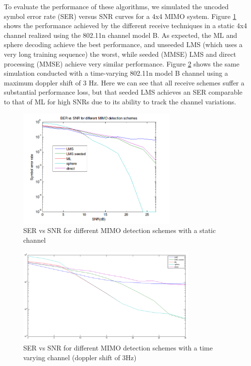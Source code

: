 \documentclass[journal]{IEEEtran}
\begin{document}
To evaluate the performance of these algorithms, we simulated the uncoded symbol error rate (SER) versus SNR curves for a 4x4 MIMO system. Figure \ref{ser_snr_different_schemes_static} shows the performance achieved by the different receive techniques in a static 4x4 channel realized using the 802.11n channel model B. As expected, the ML and sphere decoding achieve the best performance, and unseeded LMS (which uses a very long training sequence) the worst, while seeded (MMSE) LMS and direct processing (MMSE) achieve very similar performance. Figure \ref{ser_snr_different_schemes_dynamic} shows the same simulation conducted with a time-varying 802.11n model B channel using a maximum doppler shift of 3 Hz. Here we can see that all receive schemes suffer a substantial performance loss, but that seeded LMS achieves an SER comparable to that of ML for high SNRs due to its ability to track the channel variations. 

\begin{figure}
\centering
\includegraphics[width=8cm]{images/static_channel_decoder_comparison.png}
\caption{SER vs SNR for different MIMO detection schemes with a static channel}
\label{ser_snr_different_schemes_static}
\end{figure}

\begin{figure}
\centering
\includegraphics[width=9cm]{images/time_varying_channel_doppler_3.png}
\caption{SER vs SNR for different MIMO detection schemes with a time varying channel (doppler shift of 3Hz)}
\label{ser_snr_different_schemes_dynamic}
\end{figure}
\end{document}
